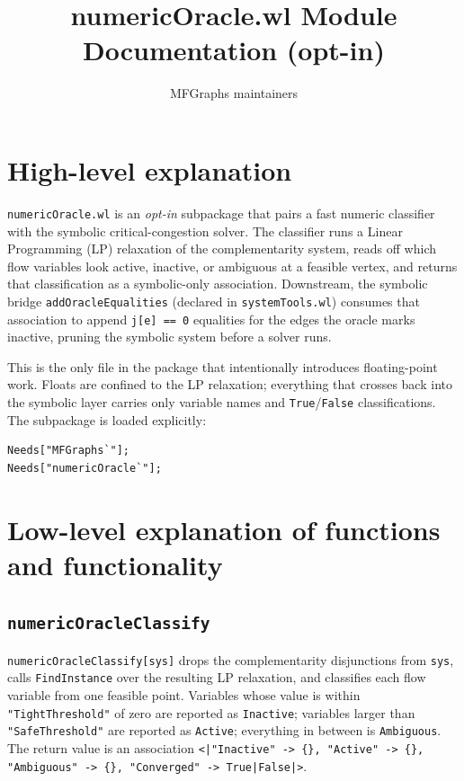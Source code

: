 \documentclass[11pt]{article}
\title{numericOracle.wl Module Documentation (opt-in)}
\author{MFGraphs maintainers}
\date{}
\begin{document}
\maketitle

\section{High-level explanation}

\texttt{numericOracle.wl} is an \emph{opt-in} subpackage that pairs a fast numeric classifier with the symbolic critical-congestion solver. The classifier runs a Linear Programming (LP) relaxation of the complementarity system, reads off which flow variables look active, inactive, or ambiguous at a feasible vertex, and returns that classification as a symbolic-only association. Downstream, the symbolic bridge \texttt{addOracleEqualities} (declared in \texttt{systemTools.wl}) consumes that association to append \texttt{j[e] == 0} equalities for the edges the oracle marks inactive, pruning the symbolic system before a solver runs.

This is the only file in the package that intentionally introduces floating-point work. Floats are confined to the LP relaxation; everything that crosses back into the symbolic layer carries only variable names and \texttt{True}/\texttt{False} classifications. The subpackage is loaded explicitly:

\begin{verbatim}
Needs["MFGraphs`"];
Needs["numericOracle`"];
\end{verbatim}

\section{Low-level explanation of functions and functionality}

\subsection*{\texttt{numericOracleClassify}}

\texttt{numericOracleClassify[sys]} drops the complementarity disjunctions from \texttt{sys}, calls \texttt{FindInstance} over the resulting LP relaxation, and classifies each flow variable from one feasible point. Variables whose value is within \texttt{"TightThreshold"} of zero are reported as \texttt{Inactive}; variables larger than \texttt{"SafeThreshold"} are reported as \texttt{Active}; everything in between is \texttt{Ambiguous}. The return value is an association \texttt{<|"Inactive" -> \{\textellipsis\}, "Active" -> \{\textellipsis\}, "Ambiguous" -> \{\textellipsis\}, "Converged" -> True|False|>}.
\end{document}
